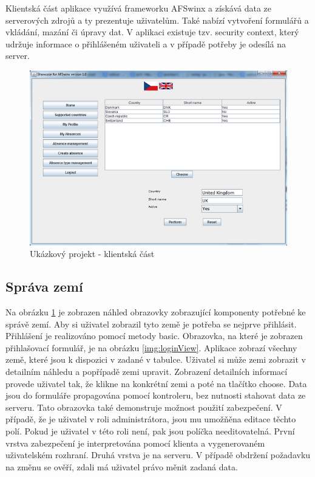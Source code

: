Klientská část aplikace využívá frameworku AFSwinx a získává data ze serverových zdrojů a ty prezentuje uživatelům. Také nabízí vytvoření formulářů a vkládání, mazání či úpravy dat. V aplikaci existuje tzv. security context, který udržuje informace o přihlášeném uživateli a v případě potřeby je odesílá na server. 

\begin{figure}[h!]
\includegraphics[width=\linewidth]{images/Country}
\caption{Ukázkový projekt - klientská část}  
\label{img:country}
\end{figure}

\subsection{Správa zemí}
Na obrázku \ref{img:country} je zobrazen náhled obrazovky zobrazující komponenty potřebné ke správě zemí. Aby si uživatel zobrazil tyto země je potřeba se nejprve přihlásit. Přihlášení je realizováno pomocí metody basic. Obrazovka, na které je zobrazen přihlašovací formulář, je na obrázku \ref{img:loginView}. Aplikace zobrazí všechny země, které jsou k dispozici v zadané v tabulce. Uživatel si může zemi zobrazit v detailním náhledu a popřípadě zemi upravit. Zobrazení detailních informací provede uživatel tak, že klikne na konkrétní zemi a poté na tlačítko choose. Data jsou do formuláře propagována pomocí kontroleru, bez nutnosti stahovat data ze serveru. Tato obrazovka také demonstruje možnost použití zabezpečení. V případě, že je uživatel v roli administrátora, jsou mu umožňěna editace těchto polí. Pokud je uživatel v této roli není, pak jsou políčka needitovatelná. První vrstva zabezpečení je interpretována pomocí klienta a vygenerovaném uživatelském rozhraní. Druhá vrstva je na serveru. V případě obdržení požadavku na změnu se ověří, zdali má uživatel právo měnit zadaná data.
